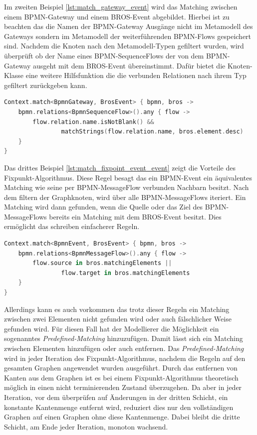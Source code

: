 Im zweiten Beispiel \cref{lst:match_gateway_event} wird das Matching zwischen einem BPMN-Gateway und einem BROS-Event abgebildet.
Hierbei ist zu beachten das die Namen der BPMN-Gateway Ausgänge nicht im Metamodell des Gateways sondern im Metamodell der weiterführenden BPMN-Flows gespeichert sind.
Nachdem die Knoten nach den Metamodell-Typen gefiltert wurden, wird überprüft ob der Name eines BPMN-SequenceFlows der von dem BPMN-Gateway ausgeht mit dem BROS-Event übereinstimmt.
Dafür bietet die Knoten-Klasse eine weitere Hilfsfunktion die die verbunden Relationen nach ihrem Typ gefiltert zurückgeben kann.

\begin{lstlisting}[language=Kotlin, caption=Matching Regel von einem BPMN-Gateway und einem BROS-Event, label=lst:match_gateway_event]
Context.match<BpmnGateway, BrosEvent> { bpmn, bros ->
    bpmn.relations<BpmnSequenceFlow>().any { flow ->
        flow.relation.name.isNotBlank() &&
                matchStrings(flow.relation.name, bros.element.desc)
    }
}
\end{lstlisting}

Das drittes Beispiel \cref{lst:match_fixpoint_event_event} zeigt die Vorteile des Fixpunkt-Algorithmus.
Diese Regel besagt das ein BPMN-Event ein äquivalentes Matching wie seine per BPMN-MessageFlow verbunden Nachbarn besitzt.
Nach dem filtern der Graphknoten, wird über alle BPMN-MessageFlows iteriert.
Ein Matching wird dann gefunden, wenn die Quelle oder das Ziel des BPMN-MessageFlows bereits ein Matching mit dem BROS-Event besitzt.
Dies ermöglicht das schreiben einfacherer Regeln.

\begin{lstlisting}[language=Kotlin, caption=Fixpunkt Matching Regel von einem BPMN-BpmnEvent und einem BROS-Event, label=lst:match_fixpoint_event_event]
Context.match<BpmnEvent, BrosEvent> { bpmn, bros ->
    bpmn.relations<BpmnMessageFlow>().any { flow ->
        flow.source in bros.matchingElements ||
                flow.target in bros.matchingElements
    }
}
\end{lstlisting}

Allerdings kann es auch vorkommen das trotz dieser Regeln ein Matching zwischen zwei Elementen nicht gefunden wird oder auch fälschlicher Weise gefunden wird.
Für diesen Fall hat der Modellierer die Möglichkeit ein sogenanntes \emph{Predefined-Matching} hinzuzufügen.
Damit lässt sich ein Matching zwischen Elementen hinzufügen oder auch entfernen.
Das \emph{Predefined-Matching} wird in jeder Iteration des Fixpunkt-Algorithmus, nachdem die Regeln auf den gesamten Graphen angewendet wurden ausgeführt.
Durch das entfernen von Kanten aus dem Graphen ist es bei einem Fixpunkt-Algorithmus theoretisch möglich in einen nicht terminierenden Zustand überzugehen.
Da aber in jeder Iteration, vor dem überprüfen auf Änderungen in der dritten Schicht, ein konstante Kantenmenge entfernt wird, reduziert dies nur den vollständigen Graphen auf einen Graphen ohne diese Kantenmenge.
Dabei bleibt die dritte Schicht, am Ende jeder Iteration, monoton wachsend. 

